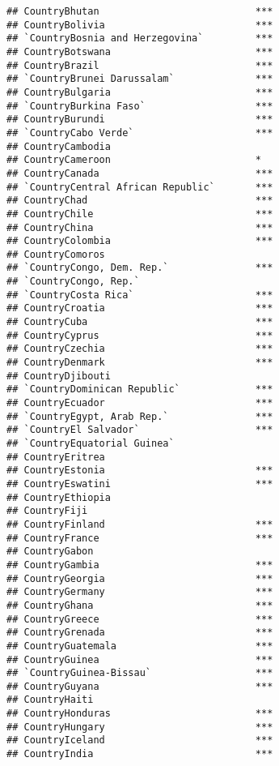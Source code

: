 \documentclass[
]{article}
\begin{document}
\begin{verbatim}
## CountryBhutan                           ***
## CountryBolivia                          ***
## `CountryBosnia and Herzegovina`         ***
## CountryBotswana                         ***
## CountryBrazil                           ***
## `CountryBrunei Darussalam`              ***
## CountryBulgaria                         ***
## `CountryBurkina Faso`                   ***
## CountryBurundi                          ***
## `CountryCabo Verde`                     ***
## CountryCambodia                            
## CountryCameroon                         *  
## CountryCanada                           ***
## `CountryCentral African Republic`       ***
## CountryChad                             ***
## CountryChile                            ***
## CountryChina                            ***
## CountryColombia                         ***
## CountryComoros                             
## `CountryCongo, Dem. Rep.`               ***
## `CountryCongo, Rep.`                       
## `CountryCosta Rica`                     ***
## CountryCroatia                          ***
## CountryCuba                             ***
## CountryCyprus                           ***
## CountryCzechia                          ***
## CountryDenmark                          ***
## CountryDjibouti                            
## `CountryDominican Republic`             ***
## CountryEcuador                          ***
## `CountryEgypt, Arab Rep.`               ***
## `CountryEl Salvador`                    ***
## `CountryEquatorial Guinea`                 
## CountryEritrea                             
## CountryEstonia                          ***
## CountryEswatini                         ***
## CountryEthiopia                            
## CountryFiji                                
## CountryFinland                          ***
## CountryFrance                           ***
## CountryGabon                               
## CountryGambia                           ***
## CountryGeorgia                          ***
## CountryGermany                          ***
## CountryGhana                            ***
## CountryGreece                           ***
## CountryGrenada                          ***
## CountryGuatemala                        ***
## CountryGuinea                           ***
## `CountryGuinea-Bissau`                  ***
## CountryGuyana                           ***
## CountryHaiti                               
## CountryHonduras                         ***
## CountryHungary                          ***
## CountryIceland                          ***
## CountryIndia                            ***

\end{verbatim}
\end{document}
